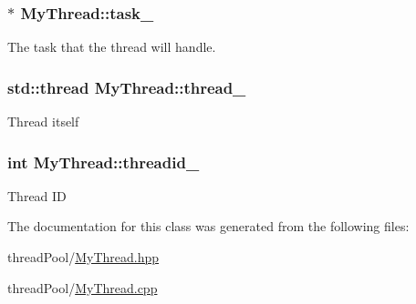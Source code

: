 \subsubsection[{\texorpdfstring{task\+\_\+}{task_}}]{$\ast$ My\+Thread\+::task\+\_\+\hspace{0.3cm}{\ttfamily [private]}}\hypertarget{classMyThread_a1013bd0ea254f26c337d8e35dd1c5762}{}\label{classMyThread_a1013bd0ea254f26c337d8e35dd1c5762}
The task that the thread will handle. 
\subsubsection[{\texorpdfstring{thread\+\_\+}{thread_}}]{\setlength{\rightskip}{0pt plus 5cm}std\+::thread My\+Thread\+::thread\+\_\+\hspace{0.3cm}{\ttfamily [private]}}\hypertarget{classMyThread_afb1913aba4cad629b8c6e1de298abfea}{}\label{classMyThread_afb1913aba4cad629b8c6e1de298abfea}
Thread itself 
\subsubsection[{\texorpdfstring{threadid\+\_\+}{threadid_}}]{\setlength{\rightskip}{0pt plus 5cm}int My\+Thread\+::threadid\+\_\+\hspace{0.3cm}{\ttfamily [private]}}\hypertarget{classMyThread_a4ab4d45dabcb1c302ad03b9b8dbda282}{}\label{classMyThread_a4ab4d45dabcb1c302ad03b9b8dbda282}
Thread ID 

The documentation for this class was generated from the following files\+:\begin{DoxyCompactItemize}
\item 
thread\+Pool/\hyperlink{MyThread_8hpp}{My\+Thread.\+hpp}\item 
thread\+Pool/\hyperlink{MyThread_8cpp}{My\+Thread.\+cpp}\end{DoxyCompactItemize}
